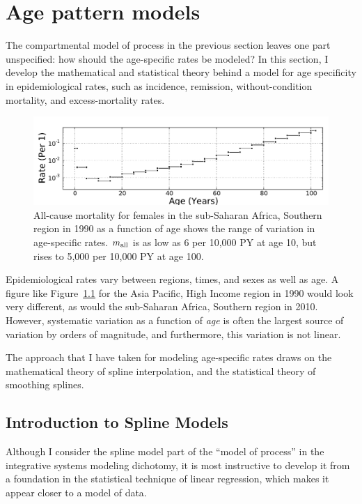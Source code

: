 \chapter{Age pattern models}
\label{theory-age_pattern_model}
The compartmental model of process in the previous section leaves one
part unspecified: how should the age-specific rates be modeled?  In
this section, I develop the mathematical and statistical theory behind
a model for age specificity in epidemiological rates, such as
incidence, remission, without-condition mortality, and
excess-mortality rates.

\begin{figure}[h]
\begin{center}
\includegraphics[width=\textwidth]{ssas-mx_female_1990.pdf}
\caption{All-cause mortality for females in the sub-Saharan Africa,
  Southern region in 1990 as a function of age shows the range of
  variation in age-specific rates.  $m_{\text{all}}$ is as low as 6 per
  10,000 PY at age 10, but rises to 5,000 per 10,000 PY at age 100.}
\label{ssas-mx_female_1990}
\end{center}
\end{figure}

Epidemiological rates vary between regions, times, and sexes as well
as age.  A figure like Figure~\ref{ssas-mx_female_1990} for the Asia
Pacific, High Income region in 1990 would look very different, as
would the sub-Saharan Africa, Southern region in 2010. However,
systematic variation as a function of \emph{age} is often the largest
source of variation by orders of magnitude, and furthermore, this
variation is not linear.

The approach that I have taken for modeling age-specific rates draws
on the mathematical theory of spline interpolation, and the
statistical theory of smoothing splines.

\section{Introduction to Spline Models}

Although I consider the spline model part of the ``model of process''
in the integrative systems modeling dichotomy, it is most instructive
to develop it from a foundation in the statistical technique of linear
regression, which makes it appear closer to a model of data.

